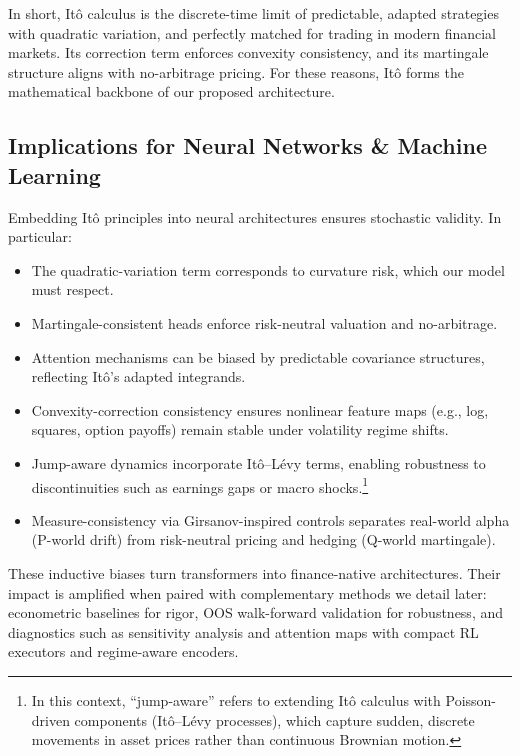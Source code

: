 \documentclass[10pt,twocolumn]{article}
\begin{document}
In short, It\^o calculus is the discrete-time limit of predictable, adapted strategies with quadratic variation, and perfectly matched for trading in modern financial markets. 
Its correction term enforces convexity consistency, and its martingale structure aligns with no-arbitrage pricing. 
For these reasons, It\^o forms the mathematical backbone of our proposed architecture.

\subsection{Implications for Neural Networks \& Machine Learning}

Embedding It\^o principles into neural architectures ensures stochastic validity. In particular:

\begin{itemize}
    \item The quadratic-variation term corresponds to curvature risk, which our model must respect.
    \item Martingale-consistent heads enforce risk-neutral valuation and no-arbitrage.
    \item Attention mechanisms can be biased by predictable covariance structures, reflecting It\^o’s adapted integrands.
    \item Convexity-correction consistency ensures nonlinear feature maps (e.g., log, squares, option payoffs) remain stable under volatility regime shifts.
    \item Jump-aware dynamics incorporate It\^o--L\'evy terms, enabling robustness to discontinuities such as earnings gaps or macro shocks.\footnote{In this context, ``jump-aware'' refers to extending It\^o calculus with Poisson-driven components (It\^o--L\'evy processes), which capture sudden, discrete movements in asset prices rather than continuous Brownian motion.}
    \item Measure-consistency via Girsanov-inspired controls separates real-world alpha (P-world drift) from risk-neutral pricing and hedging (Q-world martingale).
\end{itemize}

These inductive biases turn transformers into finance-native architectures. 
Their impact is amplified when paired with complementary methods we detail later: econometric baselines for rigor, OOS walk-forward 
validation for robustness, and diagnostics such as sensitivity analysis and attention maps with compact RL executors and regime-aware encoders.
\end{document}
